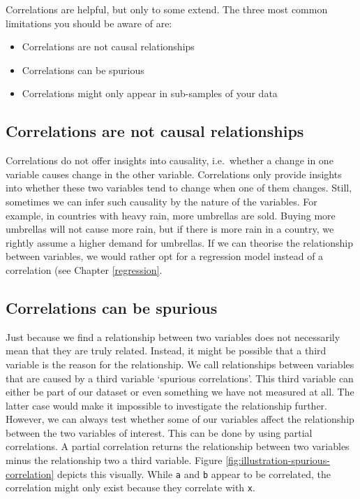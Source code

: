 \documentclass[
]{book}
\begin{document}
Correlations are helpful, but only to some extend. The three most common limitations you should be aware of are:

\begin{itemize}
\item
  Correlations are not causal relationships
\item
  Correlations can be spurious
\item
  Correlations might only appear in sub-samples of your data
\end{itemize}

\hypertarget{correlations-are-not-causal-relationships}{%
\subsection{Correlations are not causal relationships}\label{correlations-are-not-causal-relationships}}

Correlations do not offer insights into causality, i.e.~whether a change in one variable causes change in the other variable. Correlations only provide insights into whether these two variables tend to change when one of them changes. Still, sometimes we can infer such causality by the nature of the variables. For example, in countries with heavy rain, more umbrellas are sold. Buying more umbrellas will not cause more rain, but if there is more rain in a country, we rightly assume a higher demand for umbrellas. If we can theorise the relationship between variables, we would rather opt for a regression model instead of a correlation (see Chapter \ref{regression}.

\hypertarget{correlations-can-be-spurious}{%
\subsection{Correlations can be spurious}\label{correlations-can-be-spurious}}

Just because we find a relationship between two variables does not necessarily mean that they are truly related. Instead, it might be possible that a third variable is the reason for the relationship. We call relationships between variables that are caused by a third variable `spurious correlations'. This third variable can either be part of our dataset or even something we have not measured at all. The latter case would make it impossible to investigate the relationship further. However, we can always test whether some of our variables affect the relationship between the two variables of interest. This can be done by using partial correlations. A partial correlation returns the relationship between two variables minus the relationship two a third variable. Figure \ref{fig:illustration-spurious-correlation} depicts this visually. While \texttt{a} and \texttt{b} appear to be correlated, the correlation might only exist because they correlate with \texttt{x}.
\end{document}
